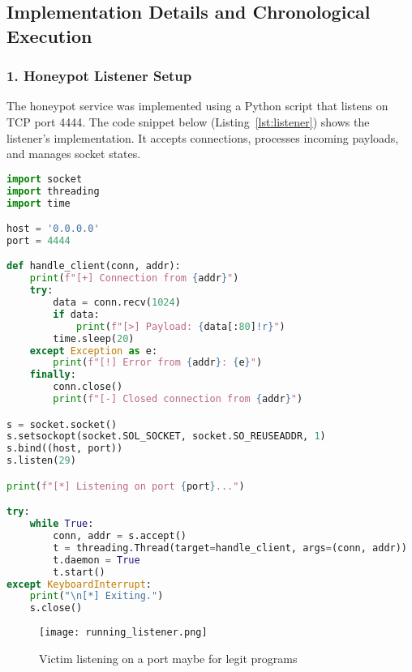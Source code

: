 \documentclass{article}
\begin{document}
\subsection*{Implementation Details and Chronological Execution}

\subsubsection*{1. Honeypot Listener Setup}
The honeypot service was implemented using a Python script that listens on TCP port 4444. The code snippet below (Listing~\ref{lst:listener}) shows the listener's implementation. It accepts connections, processes incoming payloads, and manages socket states.
\begin{lstlisting}[language=python, caption={Honeypot Listener Code (\texttt{listener\_4444.py})}, label={lst:listener}]
import socket
import threading
import time

host = '0.0.0.0'
port = 4444

def handle_client(conn, addr):
    print(f"[+] Connection from {addr}")
    try:
        data = conn.recv(1024)
        if data:
            print(f"[>] Payload: {data[:80]!r}")
        time.sleep(20)
    except Exception as e:
        print(f"[!] Error from {addr}: {e}")
    finally:
        conn.close()
        print(f"[-] Closed connection from {addr}")

s = socket.socket()
s.setsockopt(socket.SOL_SOCKET, socket.SO_REUSEADDR, 1)
s.bind((host, port))
s.listen(29)

print(f"[*] Listening on port {port}...")

try:
    while True:
        conn, addr = s.accept()
        t = threading.Thread(target=handle_client, args=(conn, addr))
        t.daemon = True
        t.start()
except KeyboardInterrupt:
    print("\n[*] Exiting.")
    s.close()
\end{lstlisting}

\begin{figure}[h!]
    \centering
    \texttt{[image: running\_listener.png]}
    \caption{Victim listening on a port maybe for legit programs}
\end{figure}
\clearpage
\end{document}
